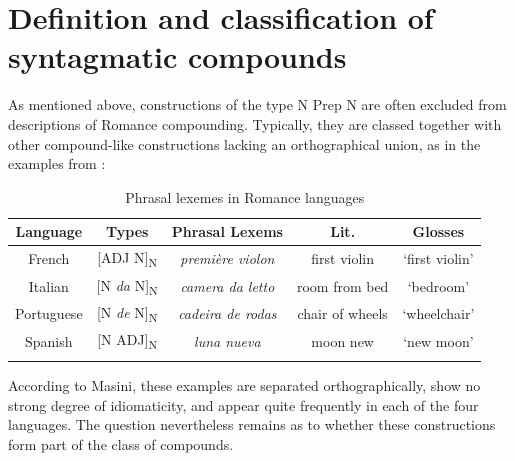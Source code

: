 \documentclass[output=paper]{langsci/langscibook}
\begin{document}
\section{Definition and classification of syntagmatic compounds} 

As mentioned above, constructions of the type N Prep N are often excluded from descriptions of Romance compounding.  Typically, they are classed together with other compound-like constructions lacking an orthographical union, as in the examples from \citep[257]{Masini:2009}: 

\begin{table}
\caption{Phrasal lexemes in Romance languages }
\label{Fig:1:Types of phrasal lexemes}
\begin{tabular}{|c|c|c|c|c|}
\hline 
\textbf{Language} & \textbf{Types }& \textbf{Phrasal Lexems} & \textbf{Lit.} & \textbf{Glosses }\\ 
\hline 
French & [ADJ N]\textsubscript{N} & \textit{première violon} & first violin & `first violin' \\ 
\hline 
Italian & [N \textit{da} N]\textsubscript{N} & \textit{camera da letto} & room from bed & `bedroom' \\ 
\hline 
Portuguese & [N \textit{de} N]\textsubscript{N} & \textit{cadeira de rodas} & chair of wheels & `wheelchair' \\ 
\hline 
Spanish & [N ADJ]\textsubscript{N} & \textit{luna nueva} & moon new & `new moon' \\ 
  \lspbottomrule
\end{tabular} 
\end{table}

According to Masini, these examples are separated orthographically, show no strong degree of idiomaticity, and appear quite frequently in each of the four languages. The question nevertheless remains as to whether these constructions form part of the class of compounds.\\
\end{document}
